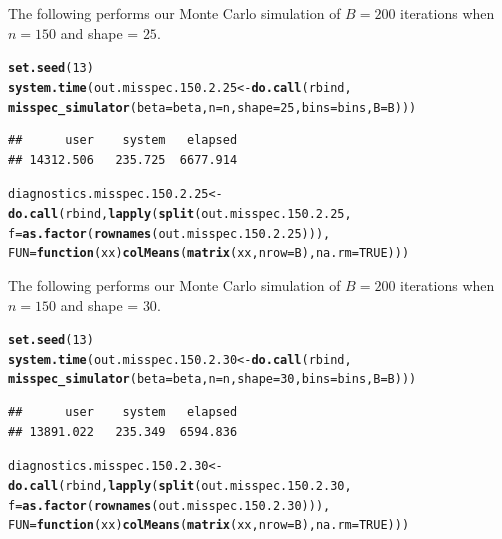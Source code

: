 \documentclass[11pt]{article}\usepackage[]{graphicx}\usepackage[]{color}
\makeatletter
\newcommand{\hlnum}[1]{\textcolor[rgb]{0.686,0.059,0.569}{#1}}%
\newcommand{\hlstd}[1]{\textcolor[rgb]{0.345,0.345,0.345}{#1}}%
\newcommand{\hlkwa}[1]{\textcolor[rgb]{0.161,0.373,0.58}{\textbf{#1}}}%
\newcommand{\hlkwb}[1]{\textcolor[rgb]{0.69,0.353,0.396}{#1}}%
\newcommand{\hlkwc}[1]{\textcolor[rgb]{0.333,0.667,0.333}{#1}}%
\newcommand{\hlkwd}[1]{\textcolor[rgb]{0.737,0.353,0.396}{\textbf{#1}}}%
\newenvironment{kframe}{%
 \def\at@end@of@kframe{}%
 \ifinner\ifhmode%
  \def\at@end@of@kframe{\end{minipage}}%
  \begin{minipage}{\columnwidth}%
 \fi\fi%
 \def\FrameCommand##1{\hskip\@totalleftmargin \hskip-\fboxsep
 \colorbox{shadecolor}{##1}\hskip-\fboxsep
     \hskip-\linewidth \hskip-\@totalleftmargin \hskip\columnwidth}%
 \MakeFramed {\advance\hsize-\width
   \@totalleftmargin\z@ \linewidth\hsize
   \@setminipage}}%
 {\par\unskip\endMakeFramed%
 \at@end@of@kframe}
\newenvironment{knitrout}{}{} %
\makeatother
\begin{document}
The following performs our Monte Carlo simulation of $B = 200$ iterations 
when $n = 150$ and shape = $25$.

\begin{knitrout}
\color{fgcolor}\begin{kframe}
\begin{alltt}
\hlkwd{set.seed}\hlstd{(}\hlnum{13}\hlstd{)}
\hlkwd{system.time}\hlstd{(out.misspec.150.2.25} \hlkwb{<-} \hlkwd{do.call}\hlstd{(rbind,}
  \hlkwd{misspec_simulator}\hlstd{(}\hlkwc{beta} \hlstd{= beta,} \hlkwc{n} \hlstd{= n,} \hlkwc{shape} \hlstd{=} \hlnum{25}\hlstd{,} \hlkwc{bins} \hlstd{= bins,} \hlkwc{B} \hlstd{= B)))}
\end{alltt}
\begin{verbatim}
##      user    system   elapsed 
## 14312.506   235.725  6677.914
\end{verbatim}
\begin{alltt}
\hlstd{diagnostics.misspec.150.2.25} \hlkwb{<-} \hlkwd{do.call}\hlstd{(rbind,} \hlkwd{lapply}\hlstd{(}\hlkwd{split}\hlstd{(out.misspec.150.2.25,}
  \hlkwc{f} \hlstd{=} \hlkwd{as.factor}\hlstd{(}\hlkwd{rownames}\hlstd{(out.misspec.150.2.25))),}
  \hlkwc{FUN} \hlstd{=} \hlkwa{function}\hlstd{(}\hlkwc{xx}\hlstd{)} \hlkwd{colMeans}\hlstd{(}\hlkwd{matrix}\hlstd{(xx,} \hlkwc{nrow} \hlstd{= B),} \hlkwc{na.rm} \hlstd{=} \hlnum{TRUE}\hlstd{)))}
\end{alltt}
\end{kframe}
\end{knitrout}


The following performs our Monte Carlo simulation of $B = 200$ iterations 
when $n = 150$ and shape = $30$.

\begin{knitrout}
\color{fgcolor}\begin{kframe}
\begin{alltt}
\hlkwd{set.seed}\hlstd{(}\hlnum{13}\hlstd{)}
\hlkwd{system.time}\hlstd{(out.misspec.150.2.30} \hlkwb{<-} \hlkwd{do.call}\hlstd{(rbind,}
  \hlkwd{misspec_simulator}\hlstd{(}\hlkwc{beta} \hlstd{= beta,} \hlkwc{n} \hlstd{= n,} \hlkwc{shape} \hlstd{=} \hlnum{30}\hlstd{,} \hlkwc{bins} \hlstd{= bins,} \hlkwc{B} \hlstd{= B)))}
\end{alltt}
\begin{verbatim}
##      user    system   elapsed 
## 13891.022   235.349  6594.836
\end{verbatim}
\begin{alltt}
\hlstd{diagnostics.misspec.150.2.30} \hlkwb{<-} \hlkwd{do.call}\hlstd{(rbind,} \hlkwd{lapply}\hlstd{(}\hlkwd{split}\hlstd{(out.misspec.150.2.30,}
  \hlkwc{f} \hlstd{=} \hlkwd{as.factor}\hlstd{(}\hlkwd{rownames}\hlstd{(out.misspec.150.2.30))),}
  \hlkwc{FUN} \hlstd{=} \hlkwa{function}\hlstd{(}\hlkwc{xx}\hlstd{)} \hlkwd{colMeans}\hlstd{(}\hlkwd{matrix}\hlstd{(xx,} \hlkwc{nrow} \hlstd{= B),} \hlkwc{na.rm} \hlstd{=} \hlnum{TRUE}\hlstd{)))}
\end{alltt}
\end{kframe}
\end{knitrout}
\end{document}
